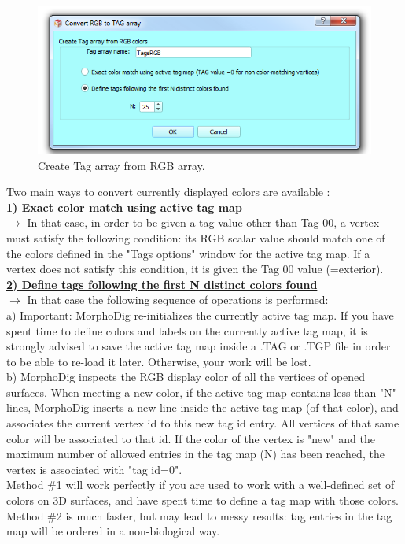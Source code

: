 \begin{figure}
  \centering
  \includegraphics[scale=0.5]{images/12/tags_from_rgb.png} 
	\caption{Create Tag array from RGB array.}
\label{rgb_conversion}
\end{figure}
Two main ways to convert currently displayed colors are available :\\
\textbf{\underline{1) Exact color match using active tag map}}\\
$\rightarrow$ In that case, in order to be given a tag value other than Tag 00, a vertex must satisfy the following condition: its RGB scalar value should match one of the colors defined in the "Tags options" window for the active tag map. If a vertex does not satisfy this condition, it is given the Tag 00 value (=exterior).\\
\textbf{\underline{2) Define tags following the first N distinct colors found}}\\
$\rightarrow$ In that case the following sequence of operations is performed:\\
a) Important: MorphoDig re-initializes the currently active tag map. If you have spent time to define colors and labels on the currently active tag map, it is strongly advised to save the active tag map inside a .TAG or .TGP file in order to be able to re-load it later. Otherwise, your work will be lost.\\
b) MorphoDig inspects the RGB display color of all the vertices of opened surfaces. When meeting a new color, if the active tag map contains less than "N" lines, MorphoDig inserts a new line inside the active tag map (of that color), and associates the current vertex id to this new tag id entry. All vertices of that same color will be associated to that id. If the color of the vertex is "new" and the maximum number of allowed entries in the tag map (N) has been reached, the vertex is associated with "tag id=0".\\
Method \#1 will work perfectly if you are used to work with a well-defined set of colors on 3D surfaces, and have spent time to define a tag map with those colors.\\
Method \#2 is much faster, but may lead to messy results: tag entries in the tag map will be ordered in a non-biological way.\\

